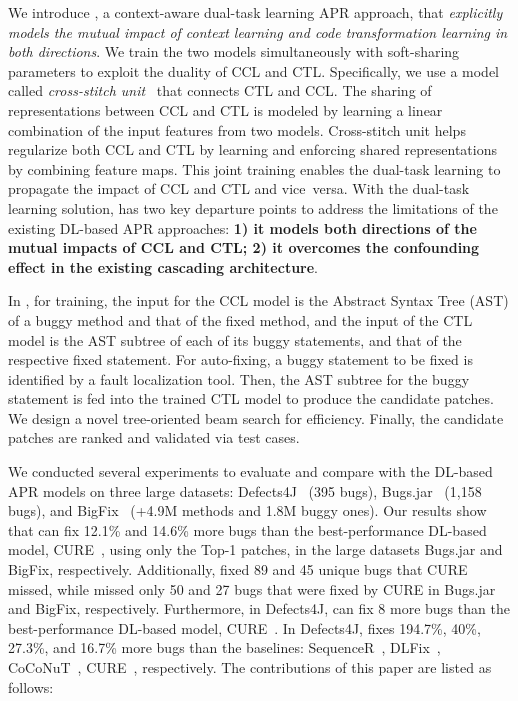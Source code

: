 
We introduce {\tool}, a context-aware dual-task learning APR approach,
that {\em explicitly models the mutual impact of context learning and
  code transformation learning in both directions}. We train the two
models simultaneously with soft-sharing parameters to exploit the
duality of CCL and CTL. Specifically, we use a model called {\em
  cross-stitch unit}~\cite{misra2016cross} that connects CTL and
CCL. The sharing of representations between CCL and CTL is modeled by
learning a linear combination of the input features from two
models. Cross-stitch unit helps regularize both CCL and CTL by
learning and enforcing shared representations by combining feature
maps. This joint training enables the dual-task learning to propagate
the impact of CCL and CTL and vice~versa. With the dual-task learning
solution, {\tool} has two key departure points to address the
limitations of the existing DL-based APR approaches: {\bf 1) it models
  both directions of the mutual impacts of CCL and CTL; 2) it
  overcomes the confounding effect in the existing cascading
  architecture}.

In {\tool}, for training, the input for the CCL model is the Abstract
Syntax Tree (AST) of a buggy method and that of the fixed method, and
the input of the CTL model is the AST subtree of each of its buggy
statements, and that of the respective fixed statement. For
auto-fixing, a buggy statement to be fixed is identified by a fault
localization tool. Then, the AST subtree for the buggy statement is
fed into the trained CTL model to produce the candidate patches. We
design a novel tree-oriented beam search for efficiency. Finally, the
candidate patches are ranked and validated via test cases.

We conducted several experiments to evaluate and compare {\tool} with
the DL-based APR models on three large datasets:
Defects4J~\cite{defects4j} (395 bugs), Bugs.jar~\cite{saha2018bugs}
(1,158 bugs), and BigFix~\cite{yioopsla19} (+4.9M methods and 1.8M
buggy ones).
Our results show that {\tool} can fix 12.1\% and 14.6\% more bugs than
the best-performance DL-based model, CURE~\cite{cure-icse21}, using
only the Top-1 patches, in the large datasets Bugs.jar and BigFix,
respectively. Additionally, {\tool} fixed 89 and 45 unique bugs that
CURE missed, while {\tool} missed only 50 and 27 bugs that were fixed
by CURE in Bugs.jar and BigFix, respectively.  Furthermore, in
Defects4J, {\tool} can fix 8 more bugs than the best-performance
DL-based model, CURE~\cite{cure-icse21}. In Defects4J, {\tool} fixes
194.7\%, 40\%, 27.3\%, and 16.7\% more bugs than the baselines:
SequenceR~\cite{chen2018sequencer}, DLFix~\cite{icse20},
CoCoNuT~\cite{lutellier2020coconut}, CURE~\cite{cure-icse21},
respectively. The contributions of this paper are listed as follows:

